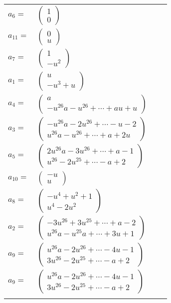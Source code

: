 \documentclass[1p]{elsarticle_modified}
\theoremstyle{definition}
\begin{document}
\begin{tabular}{m{7pt} m{180pt} m{7pt} m{180pt} }
\flushright $a_{6}=$&$\begin{pmatrix}1\\0\end{pmatrix}$ \\
\flushright $a_{11}=$&$\begin{pmatrix}0\\u\end{pmatrix}$ \\
\flushright $a_{7}=$&$\begin{pmatrix}1\\- u^2\end{pmatrix}$ \\
\flushright $a_{1}=$&$\begin{pmatrix}u\\- u^3+u\end{pmatrix}$ \\
\flushright $a_{4}=$&$\begin{pmatrix}a\\- u^{26} a- u^{26}+\cdots+a u+u\end{pmatrix}$ \\
\flushright $a_{3}=$&$\begin{pmatrix}- u^{26} a-2 u^{26}+\cdots- u-2\\u^{26} a- u^{26}+\cdots+a+2 u\end{pmatrix}$ \\
\flushright $a_{5}=$&$\begin{pmatrix}2 u^{26} a-3 u^{26}+\cdots+a-1\\u^{26}-2 u^{25}+\cdots- a+2\end{pmatrix}$ \\
\flushright $a_{10}=$&$\begin{pmatrix}- u\\u\end{pmatrix}$ \\
\flushright $a_{8}=$&$\begin{pmatrix}- u^4+u^2+1\\u^4-2 u^2\end{pmatrix}$ \\
\flushright $a_{2}=$&$\begin{pmatrix}-3 u^{26}+3 u^{25}+\cdots+a-2\\u^{26} a- u^{25} a+\cdots+3 u+1\end{pmatrix}$ \\
\flushright $a_{9}=$&$\begin{pmatrix}u^{26} a-2 u^{26}+\cdots-4 u-1\\3 u^{26}-2 u^{25}+\cdots- a+2\end{pmatrix}$\\ \flushright $a_{9}=$&$\begin{pmatrix}u^{26} a-2 u^{26}+\cdots-4 u-1\\3 u^{26}-2 u^{25}+\cdots- a+2\end{pmatrix}$\\&\end{tabular}
\end{document}
